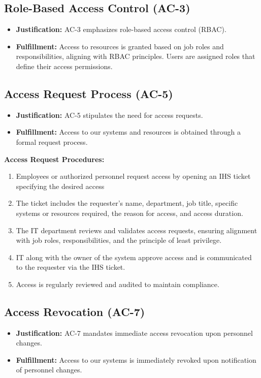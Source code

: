 \subsection{Role-Based Access Control (AC-3)}
\begin{itemize}
    \item \textbf{Justification:} AC-3 emphasizes role-based access control (RBAC). 
    \item \textbf{Fulfillment:} Access to resources is granted based on job roles and responsibilities, aligning with RBAC principles. Users are assigned roles that define their access permissions.
\end{itemize}

\subsection{Access Request Process (AC-5)}
\begin{itemize}
    \item \textbf{Justification:} AC-5 stipulates the need for access requests. 
    \item \textbf{Fulfillment:} Access to our systems and resources is obtained through a formal request process. 
\end{itemize}

\textbf{Access Request Procedures:}
\begin{enumerate}[label=\alph*.]
    \item Employees or authorized personnel request access by opening an IHS ticket specifying the desired access
    \item The ticket includes the requester's name, department, job title, specific systems or resources required, the reason for access, and access duration.
    \item The IT department reviews and validates access requests, ensuring alignment with job roles, responsibilities, and the principle of least privilege.
    \item IT along with the owner of the system approve access and is communicated to the requester via the IHS ticket.
    \item Access is regularly reviewed and audited to maintain compliance.
\end{enumerate}

\subsection{Access Revocation (AC-7)}
\begin{itemize}
    \item \textbf{Justification:} AC-7 mandates immediate access revocation upon personnel changes. 
    \item \textbf{Fulfillment:} Access to our systems is immediately revoked upon notification of personnel changes. 
\end{itemize}

